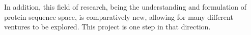 \documentclass[a4paper,11pt]{article}
\begin{document}
In addition, this field of research, being the understanding and formulation of protein sequence space, is comparatively new, allowing for many different ventures to be explored. This project is one step in that direction.






\end{document}
